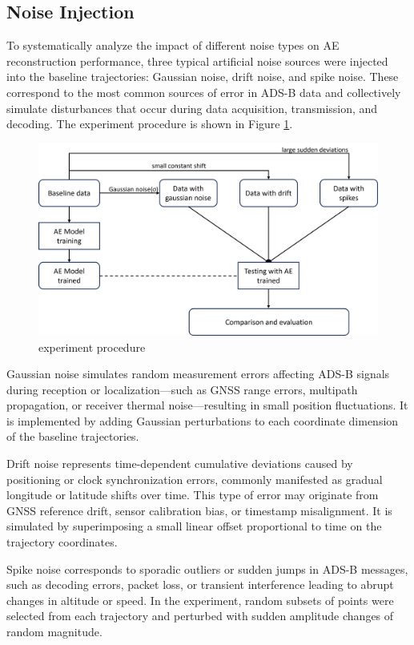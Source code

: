 \subsection{Noise Injection}
To systematically analyze the impact of different noise types on AE reconstruction performance, three typical artificial noise sources were injected into the baseline trajectories: Gaussian noise, drift noise, and spike noise. These correspond to the most common sources of error in ADS-B data and collectively simulate disturbances that occur during data acquisition, transmission, and decoding. The experiment procedure is shown in Figure \ref{fig:experiment-structure}.
\begin{figure}
	\centering
	\includegraphics[width=0.6\linewidth]{"experiment structure"}
	\caption{experiment procedure}
	\label{fig:experiment-structure}
\end{figure}

Gaussian noise simulates random measurement errors affecting ADS-B signals during reception or localization—such as GNSS range errors, multipath propagation, or receiver thermal noise—resulting in small position fluctuations. It is implemented by adding Gaussian perturbations to each coordinate dimension of the baseline trajectories.

Drift noise represents time-dependent cumulative deviations caused by positioning or clock synchronization errors, commonly manifested as gradual longitude or latitude shifts over time. This type of error may originate from GNSS reference drift, sensor calibration bias, or timestamp misalignment. It is simulated by superimposing a small linear offset proportional to time on the trajectory coordinates.

Spike noise corresponds to sporadic outliers or sudden jumps in ADS-B messages, such as decoding errors, packet loss, or transient interference leading to abrupt changes in altitude or speed. In the experiment, random subsets of points were selected from each trajectory and perturbed with sudden amplitude changes of random magnitude.

